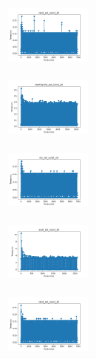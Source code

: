 \begin{figure}[H]
    \hfill
    \begin{subfigure}
        \centering
        \includegraphics[width=0.234\textwidth]{img/am01mej/rand_set_const_20_277451237_time.png}
    \end{subfigure}
    \hfill
    \begin{subfigure}
        \centering
        \includegraphics[width=0.234\textwidth]{img/am01mej/newthyroid_set_const_20_277451237_time.png}
    \end{subfigure}
    \hfill
    \begin{subfigure}
        \centering
        \includegraphics[width=0.234\textwidth]{img/am01mej/iris_set_const_20_49258669_time.png}
    \end{subfigure}
    \hfill
    \begin{subfigure}
        \centering
        \includegraphics[width=0.234\textwidth]{img/am01mej/ecoli_set_const_20_49258669_time.png}
    \end{subfigure}
    \hfill
    \begin{subfigure}
        \centering
        \includegraphics[width=0.234\textwidth]{img/am01mej/rand_set_const_20_49258669_time.png}
    \end{subfigure}
    \hfill
    \begin{subfigure}

\end{subfigure}
\end{figure}
